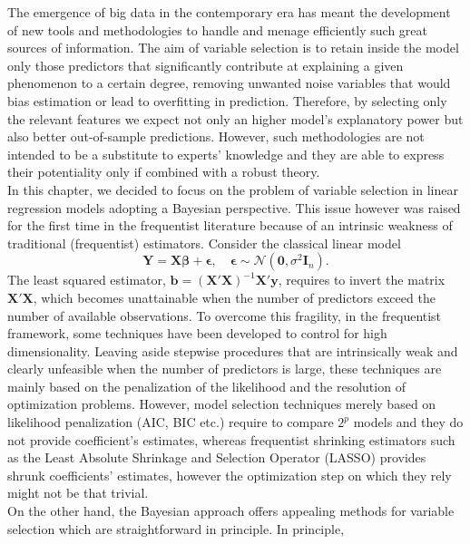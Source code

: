 \documentclass[
  12pt,
]{book}
\theoremstyle{break}
\theoremstyle{nonumberplain}
\begin{document}
The emergence of big data in the contemporary era has meant the
development of new tools and methodologies to handle and menage
efficiently such great sources of information. The aim of variable
selection is to retain inside the model only those predictors that
significantly contribute at explaining a given phenomenon to a certain
degree, removing unwanted noise variables that would bias estimation or
lead to overfitting in prediction. Therefore, by selecting only the
relevant features we expect not only an higher model's explanatory power
but also better out-of-sample predictions. However, such methodologies
are not intended to be a substitute to experts' knowledge and they are
able to express their potentiality only if combined with a robust
theory.\\
In this chapter, we decided to focus on the problem of variable
selection in linear regression models adopting a Bayesian perspective.
This issue however was raised for the first time in the frequentist
literature because of an intrinsic weakness of traditional (frequentist)
estimators. Consider the classical linear model
\begin{equation*}\label{eq:regmod}
\boldsymbol{Y} = \boldsymbol{X} \boldsymbol{\beta} + \boldsymbol{\epsilon},\quad  \boldsymbol{\epsilon} \sim \mathcal{N}(\boldsymbol{0},\sigma^{2}\boldsymbol{I}_{n}).
\end{equation*} The least squared estimator,
\(\boldsymbol{b}=(\boldsymbol{X}'\boldsymbol{X})^{-1}\boldsymbol{X}'\boldsymbol{y}\),
requires to invert the matrix \(\boldsymbol{X}'\boldsymbol{X}\), which
becomes unattainable when the number of predictors exceed the number of
available observations. To overcome this fragility, in the frequentist
framework, some techniques have been developed to control for high
dimensionality. Leaving aside stepwise procedures that are intrinsically
weak and clearly unfeasible when the number of predictors is large,
these techniques are mainly based on the penalization of the likelihood
and the resolution of optimization problems. However, model selection
techniques merely based on likelihood penalization (AIC, BIC etc.)
require to compare \(2^{p}\) models and they do not provide
coefficient's estimates, whereas frequentist shrinking estimators such
as the Least Absolute Shrinkage and Selection Operator (LASSO) provides
shrunk coefficients' estimates, however the optimization step on which
they rely might not be that trivial.\\
On the other hand, the Bayesian approach offers appealing methods for
variable selection which are straightforward in principle. In principle,
\end{document}
